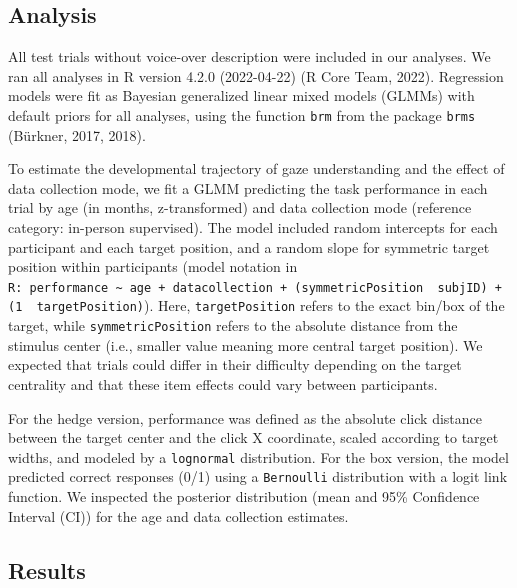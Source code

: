 \documentclass[
  man,floatsintext]{apa6}
\begin{document}
\hypertarget{analysis}{%
\subsection{Analysis}\label{analysis}}

All test trials without voice-over description were included in our analyses.
We ran all analyses in R version 4.2.0 (2022-04-22) (R Core Team, 2022).
Regression models were fit as Bayesian generalized linear mixed models (GLMMs) with default priors for all analyses, using the function \texttt{brm} from the package \texttt{brms} (Bürkner, 2017, 2018).

To estimate the developmental trajectory of gaze understanding and the effect of data collection mode, we fit a GLMM predicting the task performance in each trial by age (in months, z-transformed) and data collection mode (reference category: in-person supervised).
The model included random intercepts for each participant and each target position, and a random slope for symmetric target position within participants (model notation in \texttt{R:\ performance\ \textasciitilde{}\ age\ +\ datacollection\ +\ (symmetricPosition\ \textbar{}\ subjID)\ +\ (1\ \textbar{}\ targetPosition)}).
Here, \texttt{targetPosition} refers to the exact bin/box of the target, while \texttt{symmetricPosition} refers to the absolute distance from the stimulus center (i.e., smaller value meaning more central target position).
We expected that trials could differ in their difficulty depending on the target centrality and that these item effects could vary between participants.

For the hedge version, performance was defined as the absolute click distance between the target center and the click X coordinate, scaled according to target widths, and modeled by a \texttt{lognormal} distribution.
For the box version, the model predicted correct responses (0/1) using a \texttt{Bernoulli} distribution with a logit link function.
We inspected the posterior distribution (mean and 95\% Confidence Interval (CI)) for the age and data collection estimates.

\hypertarget{results}{%
\subsection{Results}\label{results}}
\end{document}
